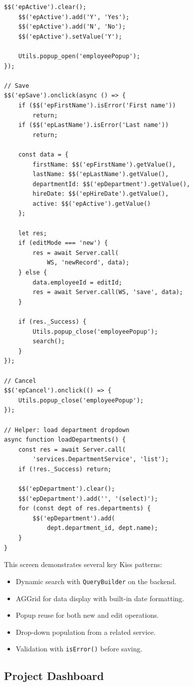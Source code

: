 \begin{lstlisting}[style=javascript]
    $$('epActive').clear();
    $$('epActive').add('Y', 'Yes');
    $$('epActive').add('N', 'No');
    $$('epActive').setValue('Y');

    Utils.popup_open('employeePopup');
});

// Save
$$('epSave').onclick(async () => {
    if ($$('epFirstName').isError('First name'))
        return;
    if ($$('epLastName').isError('Last name'))
        return;

    const data = {
        firstName: $$('epFirstName').getValue(),
        lastName: $$('epLastName').getValue(),
        departmentId: $$('epDepartment').getValue(),
        hireDate: $$('epHireDate').getValue(),
        active: $$('epActive').getValue()
    };

    let res;
    if (editMode === 'new') {
        res = await Server.call(
            WS, 'newRecord', data);
    } else {
        data.employeeId = editId;
        res = await Server.call(WS, 'save', data);
    }

    if (res._Success) {
        Utils.popup_close('employeePopup');
        search();
    }
});

// Cancel
$$('epCancel').onclick(() => {
    Utils.popup_close('employeePopup');
});

// Helper: load department dropdown
async function loadDepartments() {
    const res = await Server.call(
        'services.DepartmentService', 'list');
    if (!res._Success) return;

    $$('epDepartment').clear();
    $$('epDepartment').add('', '(select)');
    for (const dept of res.departments) {
        $$('epDepartment').add(
            dept.department_id, dept.name);
    }
}
\end{lstlisting}

\noindent
This screen demonstrates several key Kiss patterns:

\begin{itemize}
  \item Dynamic search with \texttt{QueryBuilder} on the backend.
  \item AGGrid for data display with built-in date formatting.
  \item Popup reuse for both new and edit operations.
  \item Drop-down population from a related service.
  \item Validation with \texttt{isError()} before saving.
\end{itemize}

\subsection{Project Dashboard}

